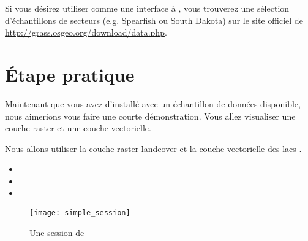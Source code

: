 Si vous désirez utiliser \qg comme une interface à \grass, vous trouverez une sélection d'échantillons de secteurs (e.g. Spearfish ou South Dakota) sur le site officiel de \grass \\
\url{http://grass.osgeo.org/download/data.php}. 

\section{Étape pratique}\label{samplesession}

Maintenant que vous avez \qg d'installé avec un échantillon de données disponible, nous aimerions vous faire une courte démonstration. Vous allez visualiser une couche raster et une couche vectorielle.

Nous allons utiliser la couche raster landcover  
et la couche vectorielle des lacs .


\begin{itemize}[label=--]
\item {}
\item {}
\item {}
\end{itemize} 

\begin{figure}[ht]
   \begin{center} 
   \texttt{[image: simple\_session]}
   \caption{Une session de \qg  \nixcaption}\label{fig:simple_session}
\end{center}
\end{figure}

